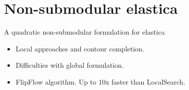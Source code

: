 \section{Non-submodular elastica}

\begin{frame}
\center
\huge
A quadratic non-submodular formulation for elastica

\vspace{2em}

\begin{minipage}{0.7\textwidth}
\normalsize
\begin{itemize}
\item{Local approaches and contour completion.}
\item{Difficulties with global formulation.}
\item{FlipFlow algorithm. Up to $10$x faster than LocalSearch.}
\end{itemize}
\end{minipage}

\end{frame}

